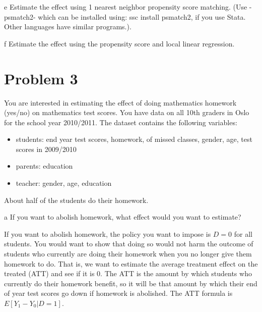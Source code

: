 \documentclass{article}
\begin{document}
\begin{problem}{e}
Estimate the effect using 1 nearest neighbor propensity score matching. (Use -psmatch2- which can be installed using: ssc install psmatch2, if you use Stata. Other languages have
similar programs.).
\end{problem}
\begin{solution}
\end{solution}

\begin{problem}{f}
Estimate the effect using the propensity score and local linear regression.
\end{problem}
\begin{solution}
\end{solution}

\newpage
\section*{Problem 3}
You are interested in estimating the effect of doing mathematics homework (yes/no) on mathematics test scores. You have data on all 10th graders in Oslo for the school year 2010/2011. The dataset contains the following variables:
\begin{itemize}
    \item students: end year test scores, homework, of missed classes, gender, age, test scores in 2009/2010
    \item parents: education
    \item teacher: gender, age, education
\end{itemize}
About half of the students do their homework.

\begin{problem}{a}
If you want to abolish homework, what effect would you want to estimate?
\end{problem}
\begin{solution}
If you want to abolish homework, the policy you want to impose is $D=0$ for all students. You would want to show that doing so would not harm the outcome of students who currently are doing their homework when you no longer give them homework to do. That is, we want to estimate the average treatment effect on the treated (ATT) and see if it is 0. The ATT is the amount by which students who currently do their homework benefit, so it will be that amount by which their end of year test scores go down if homework is abolished. The ATT formula is $E[Y_1-Y_0|D=1]$.
\end{solution}
\end{document}
